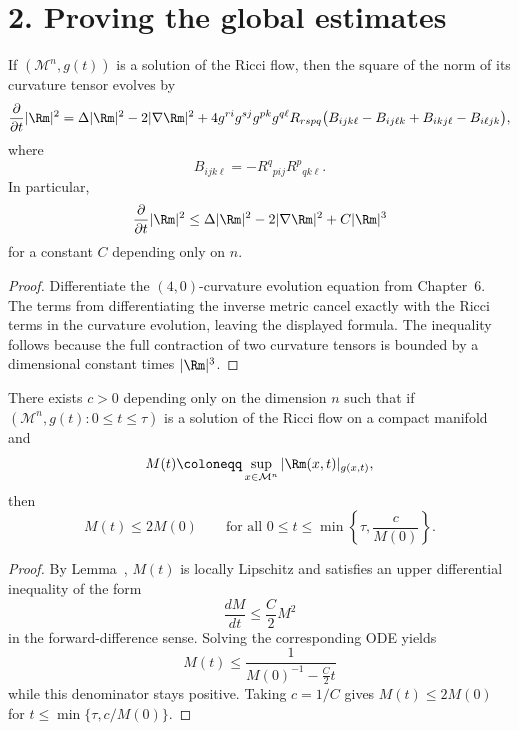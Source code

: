 \section*{2. Proving the global estimates}

\begin{lemma}
\label{ch07-lem-curvature-norm-evolution}
If \((\mathcal M^n,g(t))\) is a solution of the Ricci flow, then the square of the norm of its curvature tensor evolves by
\[
\frac{\partial}{\partial t}|\Rm|^2
=\Delta |\Rm|^2-2|\nabla \Rm|^2
+4g^{ri}g^{sj}g^{pk}g^{q\ell}R_{rspq}\bigl(B_{ijk\ell}-B_{ij\ell k}+B_{ikj\ell}-B_{i\ell jk}\bigr),
\]
where
\[
B_{ijk\ell}=-R^q{}_{pij}R^p{}_{qk\ell}.
\]
In particular,
\[
\frac{\partial}{\partial t}|\Rm|^2\le \Delta |\Rm|^2-2|\nabla \Rm|^2+C|\Rm|^3
\]
for a constant \(C\) depending only on \(n\).
\end{lemma}

\begin{proof}
\sketch Differentiate the \((4,0)\)-curvature evolution equation from Chapter~6. The terms from differentiating the inverse metric cancel exactly with the Ricci terms in the curvature evolution, leaving the displayed formula. The inequality follows because the full contraction of two curvature tensors is bounded by a dimensional constant times \(|\Rm|^3\).
\end{proof}

\begin{corollary}
\label{ch07-cor-doubling-time-estimate}
There exists \(c>0\) depending only on the dimension \(n\) such that if \((\mathcal M^n,g(t):0\le t\le \tau)\) is a solution of the Ricci flow on a compact manifold and
\[
M(t)\coloneqq \sup_{x\in\mathcal M^n}|\Rm(x,t)|_{g(x,t)},
\]
then
\[
M(t)\le 2M(0)
\qquad\text{for all }0\le t\le \min\left\{\tau,\frac{c}{M(0)}\right\}.
\]
\end{corollary}

\begin{proof}
\sketch By Lemma~, \(M(t)\) is locally Lipschitz and satisfies an upper differential inequality of the form
\[
\frac{dM}{dt}\le \frac{C}{2}M^2
\]
in the forward-difference sense. Solving the corresponding ODE yields
\[
M(t)\le \frac{1}{M(0)^{-1}-\frac C2 t}
\]
while this denominator stays positive. Taking \(c=1/C\) gives \(M(t)\le 2M(0)\) for \(t\le \min\{\tau,c/M(0)\}\).
\end{proof}

